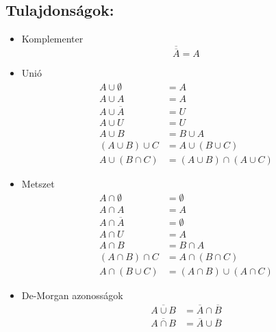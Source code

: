 \documentclass[twoside,12pt]{report}
\theoremstyle{definition}
\begin{document}
	\subsection{Tulajdonságok:}
		\begin{itemize}
			\item Komplementer
				\begin{equation*}
					\overline{\overline{A}}=A
				\end{equation*}
			\item Unió
				\begin{align*}
					A\cup\emptyset&=A\\
					A\cup A&=A\\
					A\cup\overline{A}&=U\\
					A\cup U&=U\\
					A\cup B&=B\cup A\tag{Kommutatív}\\
					(A\cup B)\cup C&=A\cup(B\cup C)\tag{Asszociatív}\\
					A\cup(B\cap C)&=(A\cup B)\cap(A\cup C)\tag{Metszetre nézve disztributív}
				\end{align*}
			\item Metszet
				\begin{align*}
					A\cap\emptyset&=\emptyset\\
					A\cap A&=A\\
					A\cap \overline{A}&=\emptyset\\
					A\cap U&=A\\
					A\cap B&=B\cap A\tag{Kommutatív}\\
					(A\cap B)\cap C&=A\cap(B\cap C)\tag{Asszociatív}\\
					A\cap(B\cup C)&=(A\cap B)\cup(A\cap C)\tag{Unióra nézve disztributív}
				\end{align*}
			\item De-Morgan azonosságok
				\begin{align*}
					\overline{A\cup B}&=\overline{A}\cap\overline{B}\\
					\overline{A\cap B}&=\overline{A}\cup\overline{B}
				\end{align*}
		\end{itemize}
\end{document}
